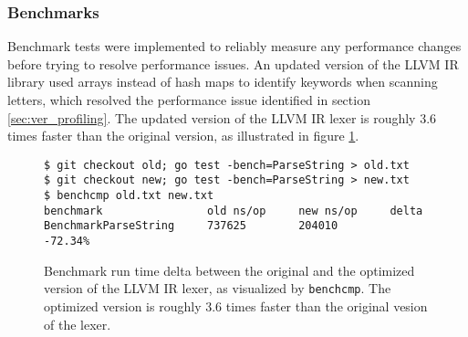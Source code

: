 
\subsubsection{Benchmarks}
\label{sec:ver_benchmarks}

Benchmark tests were implemented to reliably measure any performance changes before trying to resolve performance issues. An updated version of the LLVM IR library used arrays instead of hash maps to identify keywords when scanning letters, which resolved the performance issue identified in section \ref{sec:ver_profiling}. The updated version of the LLVM IR lexer is roughly 3.6 times faster than the original version, as illustrated in figure \ref{fig:benchmark_delta}.

\begin{figure}[htbp]
	\begin{center}
		\begin{verbatim}
$ git checkout old; go test -bench=ParseString > old.txt
$ git checkout new; go test -bench=ParseString > new.txt
$ benchcmp old.txt new.txt
benchmark                old ns/op     new ns/op     delta
BenchmarkParseString     737625        204010        -72.34%
		\end{verbatim}
		\caption{Benchmark run time delta between the original and the optimized version of the LLVM IR lexer, as visualized by \texttt{benchcmp}\protect\footnotemark. The optimized version is roughly 3.6 times faster than the original vesion of the lexer.}
		\label{fig:benchmark_delta}
	\end{center}
\end{figure}
